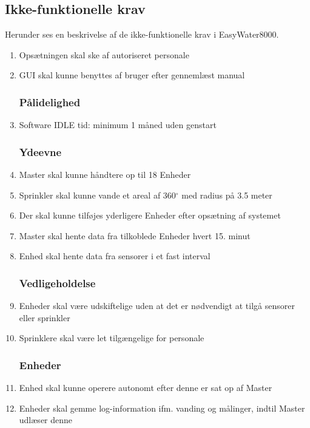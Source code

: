 \subsection{Ikke-funktionelle krav}
Herunder ses en beskrivelse af de ikke-funktionelle krav i EasyWater8000.
\begin{enumerate}

\subsubsection*{Brugbarhed}
\item Opsætningen skal ske af autoriseret personale
\item GUI skal kunne benyttes af bruger efter gennemlæst manual


\subsubsection*{Pålidelighed}
\item Software IDLE tid: minimum 1 måned uden genstart


\subsubsection*{Ydeevne}
\item Master skal kunne håndtere op til 18 Enheder
\item Sprinkler skal kunne vande et areal af 360$^{\circ}$ med radius på 3.5 meter
\item Der skal kunne tilføjes yderligere Enheder efter opsætning af systemet
\item Master skal hente data fra tilkoblede Enheder hvert 15. minut
\item Enhed skal hente data fra sensorer i et fast interval


\subsubsection*{Vedligeholdelse}
\item Enheder skal være udskiftelige uden at det er nødvendigt at tilgå sensorer eller sprinkler
\item Sprinklere skal være let tilgængelige for personale


\subsubsection*{Enheder}
\item Enhed skal kunne operere autonomt efter denne er sat op af Master
\item Enheder skal gemme log-information ifm. vanding og målinger, indtil Master udlæser denne

\end{enumerate}

